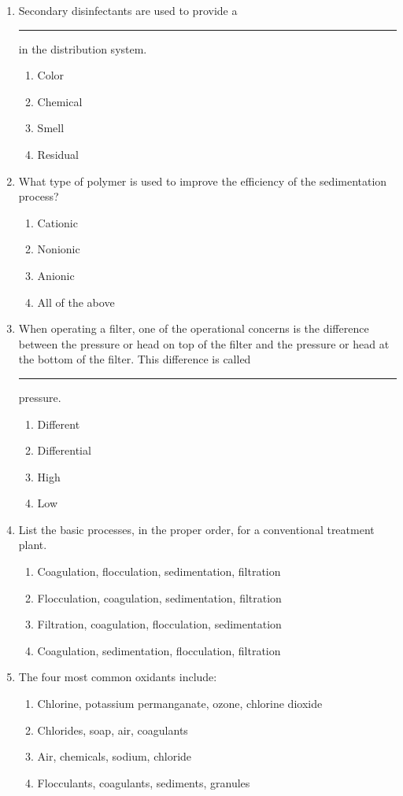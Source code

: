 \documentclass[10pt]{article}
\begin{document}
\begin{enumerate}
\begin{enumerate}
\item Secondary disinfectants are used to provide a \rule{1cm}{0.5pt}  in the distribution system.
\begin{enumerate}
\item Color
\item Chemical
\item Smell
\item Residual
\end{enumerate}

\item What type of polymer is used to improve the efficiency of the sedimentation
process?
\begin{enumerate}
\item Cationic
\item Nonionic
\item Anionic
\item All of the above
\end{enumerate}

\item When operating a filter, one of the operational concerns is the difference between the pressure or head on top of the filter and the pressure or head at the bottom of the filter. This difference is called \rule{1cm}{0.5pt}  pressure.
\begin{enumerate}
\item Different
\item Differential
\item High
\item Low
\end{enumerate}

\item List the basic processes, in the proper order, for a conventional treatment plant.
\begin{enumerate}
\item Coagulation, flocculation, sedimentation, filtration
\item Flocculation, coagulation, sedimentation, filtration
\item Filtration, coagulation, flocculation, sedimentation
\item Coagulation, sedimentation, flocculation, filtration
\end{enumerate}

\item The four most common oxidants include:
\begin{enumerate}
\item Chlorine, potassium permanganate, ozone, chlorine dioxide
\item Chlorides, soap, air, coagulants
\item Air, chemicals, sodium, chloride
\item Flocculants, coagulants, sediments, granules
\end{enumerate}


\end{enumerate}
\end{enumerate}
\end{document}
